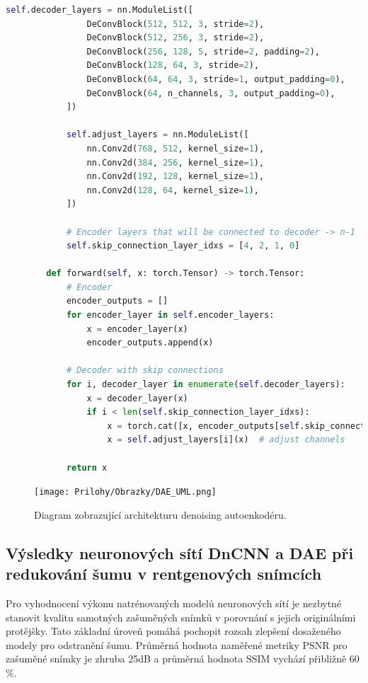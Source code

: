 \documentclass[male,czech,api_ing]{thesis}
\begin{document}
\begin{lstlisting}[language=Python, caption={Implementace autoenkodéru pro redukci šumu}, label={lst:DAEClass}]
            self.decoder_layers = nn.ModuleList([
                DeConvBlock(512, 512, 3, stride=2),
                DeConvBlock(512, 256, 3, stride=2),
                DeConvBlock(256, 128, 5, stride=2, padding=2),
                DeConvBlock(128, 64, 3, stride=2),
                DeConvBlock(64, 64, 3, stride=1, output_padding=0),
                DeConvBlock(64, n_channels, 3, output_padding=0),
            ])
            
            self.adjust_layers = nn.ModuleList([
                nn.Conv2d(768, 512, kernel_size=1),
                nn.Conv2d(384, 256, kernel_size=1),
                nn.Conv2d(192, 128, kernel_size=1),
                nn.Conv2d(128, 64, kernel_size=1),
            ])

            # Encoder layers that will be connected to decoder -> n-1
            self.skip_connection_layer_idxs = [4, 2, 1, 0]

        def forward(self, x: torch.Tensor) -> torch.Tensor:
            # Encoder
            encoder_outputs = []
            for encoder_layer in self.encoder_layers:
                x = encoder_layer(x)
                encoder_outputs.append(x)
            
            # Decoder with skip connections
            for i, decoder_layer in enumerate(self.decoder_layers):
                x = decoder_layer(x)
                if i < len(self.skip_connection_layer_idxs):
                    x = torch.cat([x, encoder_outputs[self.skip_connection_layer_idxs[i]]], dim=1)  # skip connections
                    x = self.adjust_layers[i](x)  # adjust channels
            
            return x
\end{lstlisting}

\begin{figure}[h]
    \centering
    \texttt{[image: Prilohy/Obrazky/DAE\_UML.png]}
    \caption{Diagram zobrazující architekturu denoising autoenkodéru.}
    \label{fig:DAE}
\end{figure}

\clearpage

\subsection{Výsledky neuronových sítí DnCNN a DAE při redukování šumu v rentgenových snímcích}
Pro vyhodnocení výkonu natrénovaných modelů neuronových sítí je nezbytné stanovit kvalitu samotných zašuměných snímků v porovnání s jejich originálními protějšky. Tato základní úroveň pomáhá pochopit rozsah zlepšení dosaženého modely pro odstranění šumu. Průměrná hodnota naměřené metriky PSNR pro zašuměné snímky je zhruba 25dB a průměrná hodnota SSIM vychází přibližně 60 \%.
\end{document}
